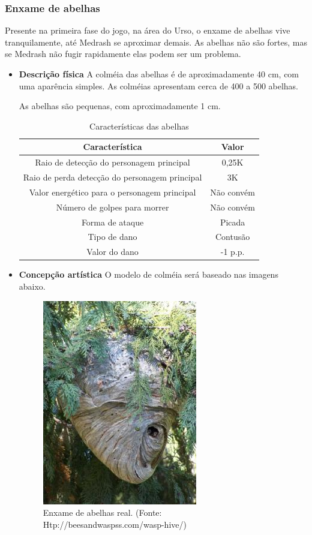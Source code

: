 \subsubsection{Enxame de abelhas}
Presente na primeira fase do jogo, na área do Urso, o enxame de abelhas vive tranquilamente, até Medrash se aproximar demais. As abelhas não são fortes, mas se Medrash não fugir rapidamente elas podem ser um problema.
\begin{itemize}
\item {\bf Descrição física}
A colméia das abelhas é de aproximadamente 40 cm, com uma aparência simples. As colméias apresentam cerca de 400 a 500 abelhas.

As abelhas são pequenas, com aproximadamente 1 cm. 
\begin{table}[H]
\begin{center}
\begin{tabular}{|c|c|}
\hline 
\textbf{Característica} & \textbf{Valor} \\ 
\hline 
Raio de detecção do personagem principal & 0,25K \\ 
\hline 
Raio de perda detecção do personagem principal & 3K \\ 
\hline 
Valor energético para o personagem principal & Não convém\\ 
\hline 
Número de golpes para morrer & Não convém \\ 
\hline 
Forma de ataque & Picada \\ 
\hline 
Tipo de dano & Contusão \\ 
\hline 
Valor do dano & -1 p.p. \\ 
\hline 
\end{tabular} 
\end{center}
\caption{Características das abelhas}
\label{table:abelhas}
\end{table}
\end{itemize}
\begin{itemize}

\item {\bf Concepção artística}
O modelo de colméia será baseado nas imagens abaixo.

 \begin{figure}[H]
 \centering
 \includegraphics[scale=0.7]{Imagens/enxame01.png}
 \caption{Enxame de abelhas real. (Fonte: Htp://beesandwaspss.com/wasp-hive/)}
\label{img:abelhas}
\end{figure}
\end{itemize}
\newpage
